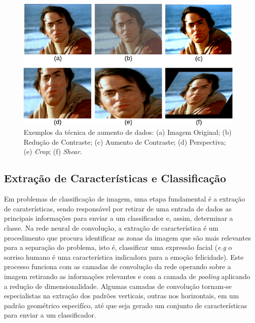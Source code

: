 \begin{figure}
\centering
\includegraphics[scale=0.46]{figuras/augmentation.png}
\caption{Exemplos da técnica de aumento de dados: (a) Imagem Original; (b) Redução de Contraste; (c) Aumento de Contraste; (d) Perspectiva; (e) \textit{Crop}; (f) \textit{Shear}. }
\label{fig:aumentoDados}
\end{figure}


\subsection{Extração de Características e Classificação}
Em problemas de classificação de imagem, uma etapa fundamental é a extração de caraterísticas, sendo responsável por retirar de uma entrada de dados as principais informações para enviar a um classificador e, assim, determinar a classe. Na rede neural de convolução, a extração de característica é um procedimento que procura identificar as zonas da imagem que são mais relevantes para a separação do problema, isto é, classificar uma expressão facial (\textit{e.g} o sorriso humano é uma característica indicadora para a emoção felicidade). Este processo funciona com as camadas de convolução da rede operando sobre a imagem retirando as informações relevantes e com a camada de \textit{pooling} aplicando a redução de dimensionalidade. Algumas camadas de convolução tornam-se especialistas na extração dos padrões verticais, outras nos horizontais, em um padrão geométrico especifíco, até que seja gerado um conjunto de características para enviar a um classificador.


